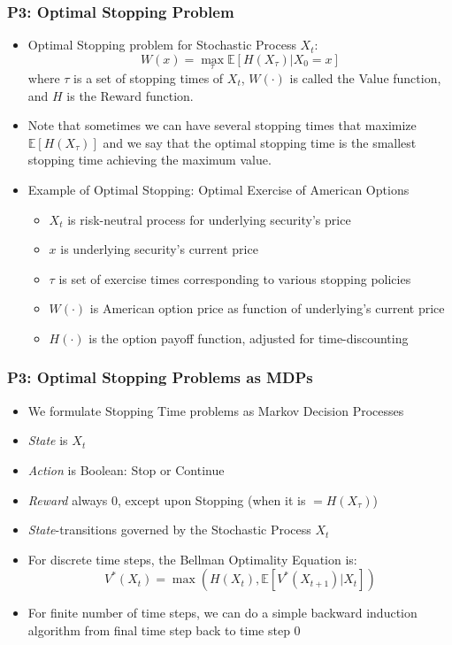 \documentclass[handout]{beamer}
\begin{document}
\begin{frame}
\frametitle{P3: Optimal Stopping Problem}
\pause
\begin{itemize}[<+->]
\item Optimal Stopping problem for Stochastic Process $X_t$: 
$$W(x) = \max_{\tau} \mathbb{E}[H(X_{\tau})|X_0 = x]$$
 where $\tau$ is a set of stopping times of $X_t$, $W(\cdot)$ is called the Value function, and $H$ is the Reward function.
\item Note that sometimes we can have several stopping times that maximize $\mathbb{E}[H(X_{\tau})]$ and we say that the optimal stopping time
is the smallest stopping time achieving the maximum value.
\item Example of Optimal Stopping: Optimal Exercise of American Options
\begin{itemize}
\item $X_t$ is risk-neutral process for underlying security's price
\item $x$ is underlying security's current price
\item $\tau$ is set of exercise times corresponding to various stopping policies
\item $W(\cdot)$ is American option price as function of underlying's current price
\item $H(\cdot)$ is the option payoff function, adjusted for time-discounting
\end{itemize}
\end{itemize}
\end{frame}


\begin{frame}
\frametitle{P3: Optimal Stopping Problems as MDPs}
\pause
\begin{itemize}[<+->]
\item We formulate Stopping Time problems as Markov Decision Processes
\item {\em State} is $X_t$
\item {\em Action} is Boolean: Stop or Continue
\item {\em Reward} always 0, except upon Stopping (when it is $=H(X_{\tau})$)
\item {\em State}-transitions governed by the Stochastic Process $X_t$
\item For discrete time steps, the Bellman Optimality Equation is:
$$V^*(X_t) = \max(H(X_t), \mathbb{E}[V^*(X_{t+1})|X_t])$$
\item For finite number of time steps, we can do a simple backward induction algorithm from final time step back to time step 0
\end{itemize}
\end{frame}
\end{document}
